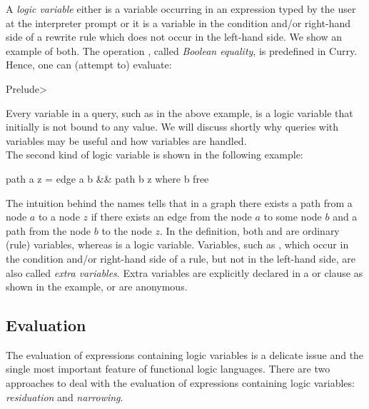 A \emph{logic variable} either is a variable occurring in an expression
typed by the user at the interpreter prompt or
it is a variable in the condition and/or right-hand side of
a rewrite rule which does not occur in the left-hand side.
We show an example of both.
The operation \ccode{==},
called \emph{Boolean equality},
is predefined in Curry.
Hence, one can (attempt to) evaluate:
%
\begin{prog}
Prelude> 
\end{prog}
%
Every variable in a query, such as  in the above example,
is a logic variable that initially is not bound to any value.
We will discuss shortly why queries with variables
may be useful and how variables are handled.
\\[1ex]
The second kind of logic variable is shown in the following
example:
%
\begin{curry}
path a z = edge a b && path b z   where b free
\end{curry}
%
The intuition behind the names tells that in a graph there exists a path
from a node $a$ to a node $z$ if there exists an edge from
the node $a$ to some node $b$ and a path from the node $b$
to the node $z$.
In the definition, both  and  are ordinary (rule)
variables, whereas  is a logic variable.
Variables, such as , which occur in the condition
and/or right-hand side of a rule, but not in the left-hand side,
are also called \emph{extra variables}.
Extra variables are explicitly declared 
in a  or  clause as shown in the example,
or are anonymous.

\subsection{Evaluation}

The evaluation of expressions containing logic variables
is a delicate issue and the single most important feature
of functional logic languages.
There are two approaches to deal with the evaluation of
expressions containing logic variables:
\emph{residuation} and
\emph{narrowing}.

